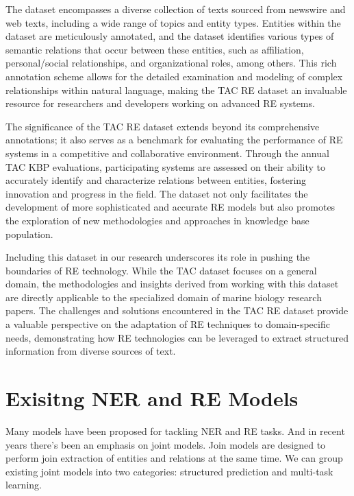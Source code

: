 The dataset encompasses a diverse collection of texts sourced from newswire and web texts, including a wide range of topics and entity types. Entities within the dataset are meticulously annotated, and the dataset identifies various types of semantic relations that occur between these entities, such as affiliation, personal/social relationships, and organizational roles, among others. This rich annotation scheme allows for the detailed examination and modeling of complex relationships within natural language, making the TAC RE dataset an invaluable resource for researchers and developers working on advanced RE systems.

The significance of the TAC RE dataset extends beyond its comprehensive annotations; it also serves as a benchmark for evaluating the performance of RE systems in a competitive and collaborative environment. Through the annual TAC KBP evaluations, participating systems are assessed on their ability to accurately identify and characterize relations between entities, fostering innovation and progress in the field. The dataset not only facilitates the development of more sophisticated and accurate RE models but also promotes the exploration of new methodologies and approaches in knowledge base population.

Including this dataset in our research underscores its role in pushing the boundaries of RE technology. While the TAC dataset focuses on a general domain, the methodologies and insights derived from working with this dataset are directly applicable to the specialized domain of marine biology research papers. The challenges and solutions encountered in the TAC RE dataset provide a valuable perspective on the adaptation of RE techniques to domain-specific needs, demonstrating how RE technologies can be leveraged to extract structured information from diverse sources of text.

\section{Exisitng NER and RE Models}
Many models have been proposed for tackling NER and RE tasks. And in recent years there's been an emphasis on joint models. Join models are designed to perform join extraction of entities and relations\cite{Zhong2020AFE} at the same time. We can group existing joint models into two categories: structured prediction and multi-task learning.

